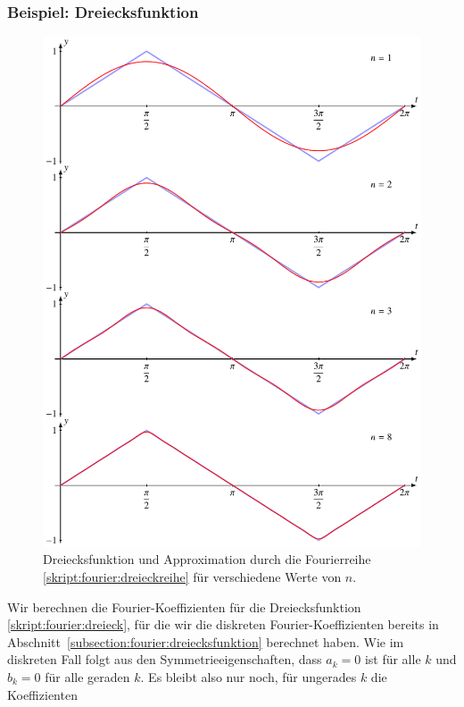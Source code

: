 \subsubsection{Beispiel: Dreiecksfunktion}
\begin{figure}
\centering
\includegraphics{chapters/6/dreieck2.pdf}
\caption{Dreiecksfunktion und Approximation durch die Fourierreihe
\eqref{skript:fourier:dreieckreihe}
für verschiedene Werte von $n$.
\label{skript:fourier:stetigdreieck}}
\end{figure}
Wir berechnen die Fourier-Koeffizienten für die Dreiecksfunktion
\eqref{skript:fourier:dreieck}, für die wir die diskreten Fourier-Koeffizienten
bereits in Abschnitt~\ref{subsection:fourier:dreiecksfunktion}
berechnet haben.
Wie im diskreten Fall folgt aus den Symmetrieeigenschaften, dass $a_k=0$
ist für alle $k$ und $b_k=0$ für alle geraden $k$.
Es bleibt also nur noch, für ungerades $k$
die Koeffizienten
